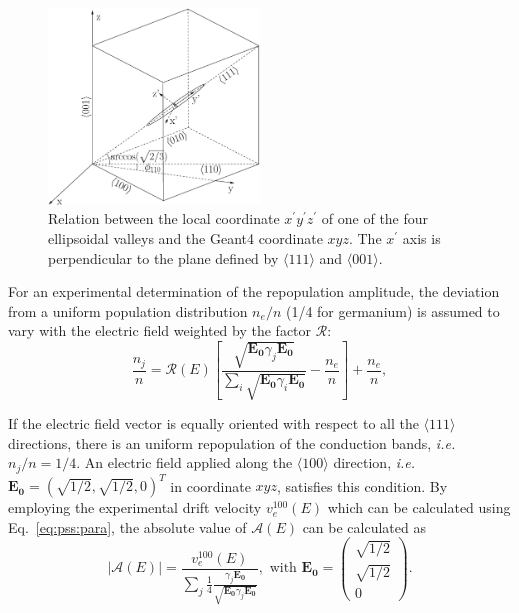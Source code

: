 \begin{figure}[tbhp]
  \centering
  \includegraphics[width=0.5\textwidth]{axes}  
  \caption{Relation between the local coordinate     $x^{\prime}y^{\prime}z^{\prime}$ of one of the four ellipsoidal     valleys and the Geant4 coordinate $xyz$. The $x^{\prime}$ axis is     perpendicular to the plane defined by $\langle111\rangle$ and     $\langle001\rangle$.}
  \label{fig:pss:axes}
\end{figure}

For an experimental determination of the repopulation amplitude, the deviation from a uniform population distribution $n_{e}/n$ (1/4 for germanium) is assumed to vary with the electric field weighted by the factor $\mathcal{R}$:
\begin{equation}
  \label{eq:pss:nion}
  \frac{n_{j}}{n} = \mathcal{R}(E)   \left[         \frac{\sqrt{\mathbf{E_{0}}\gamma_{j}\mathbf{E_{0}}}}
    {\sum_{i}\sqrt{\mathbf{E_{0}}\gamma_{i}\mathbf{E_{0}}}} -               \frac{n_{e}}{n} \right] + \frac{n_{e}}{n}, 
\end{equation}

If the electric field vector is equally oriented with respect to all the $\langle111\rangle$ directions, there is an uniform repopulation of the conduction bands, \textit{i.e.} $n_{j}/n = 1/4$. An electric field applied along the $\langle100\rangle$ direction, \textit{i.e.} $\mathbf{E_{0}} = (\sqrt{1/2},\sqrt{1/2},0)^{T}$ in coordinate $xyz$, satisfies this condition. By employing the experimental drift velocity $v_{e}^{100}(E)$ which can be calculated using Eq.~\ref{eq:pss:para}, the absolute value of $\mathcal{A}(E)$ can be calculated as
\begin{equation}
  \label{eq:pss:ae}
  |\mathcal{A}(E)| = \frac{v_{e}^{100}(E)}  {\displaystyle \sum_{j}     \frac{1}{4}     \frac{\gamma_{j}\mathbf{E_{0}}}         {\sqrt{\mathbf{E_{0}}\gamma_{j}\mathbf{E_{0}}}} },  \mbox{ with }       \mathbf{E_{0}} = \left( \begin{array}{c} 
    \sqrt{1/2}\\\sqrt{1/2}\\0 \end{array} \right).
\end{equation}


